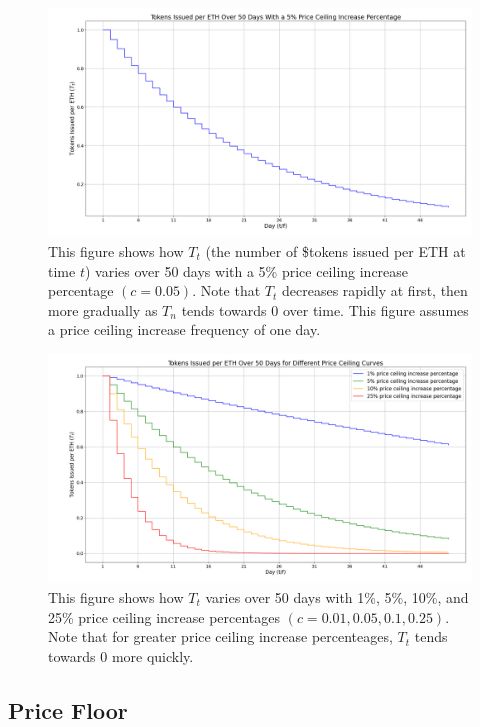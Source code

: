 \documentclass{article}
\begin{document}
\begin{figure}[h]\label{fig:single-ceiling-curve}
  \centering
  \includegraphics[width=\textwidth]{figures/single-ceiling-percentage.png}
   \caption{This figure shows how $T_t$ (the number of \$tokens issued per ETH at time $t$) varies over 50 days with a 5\% price ceiling increase percentage $(c = 0.05)$. Note that $T_t$ decreases rapidly at first, then more gradually as $T_n$ tends towards 0 over time. This figure assumes a price ceiling increase frequency of one day.}
\end{figure}


\begin{figure}[h]
  \centering
  \includegraphics[width=\textwidth]{figures/multi-ceiling-percentages.png}
  \caption{This figure shows how $T_t$ varies over 50 days with 1\%, 5\%, 10\%, and 25\% price ceiling increase percentages $(c = 0.01, 0.05, 0.1, 0.25)$. Note that for greater price ceiling increase percenteages, $T_t$ tends towards 0 more quickly.}
\end{figure}

\subsection{Price Floor}
\end{document}
